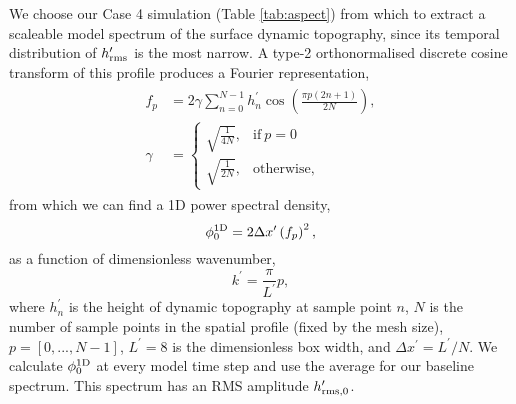 \documentclass[trackchanges]{aastex63}
\begin{document}
We choose our Case 4 simulation (Table \ref{tab:aspect}) from which to extract a scaleable model spectrum of the surface dynamic topography, since its temporal distribution of $h_{\rm rms}^\prime$ is the most narrow. A type-2 orthonormalised discrete cosine transform of this profile produces a Fourier representation,
\begin{align}
    \begin{split}
    f_p &= 2 \gamma \sum_{n=0}^{N-1} h_n^\prime \cos \left( \frac{\pi p (2n + 1)}{2N}\right),\\
    \gamma &= 
    \begin{cases}
      \sqrt{\frac{1}{4N}}, & \text{if}\ p=0 \\
      \sqrt{\frac{1}{2N}}, & \text{otherwise,}
    \end{cases}
\end{split}
\end{align}
from which we can find a 1D power spectral density,
\begin{equation}
    \phi^{\rm 1D}_0 = 2 \Delta x^\prime \left(f_p\right)^2,
\end{equation}
as a function of dimensionless wavenumber,
\begin{equation}
    k^\prime = \frac{\pi}{L^\prime} p,
\end{equation}
where $h_n^\prime$ is the height of dynamic topography at sample point $n$, $N$ is the number of sample points in the spatial profile (fixed by the mesh size), $p = [0, ..., N - 1]$, $L^\prime = 8$ is the dimensionless box width, and $\Delta x^\prime = L^\prime / N$. We calculate $\phi^{\rm 1D}_0$ at every model time step and use the average for our baseline spectrum. This spectrum has an RMS amplitude $h^{\prime}_{\rm rms, 0}$. 
\end{document}
